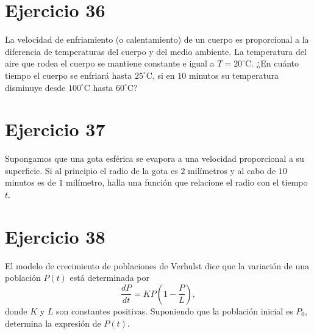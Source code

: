 \documentclass[12pt]{article}
\begin{document}
\section*{Ejercicio 36}
La velocidad de enfriamiento (o calentamiento) de un cuerpo es proporcional a la diferencia de temperaturas del cuerpo y del medio ambiente. La temperatura del aire que rodea el cuerpo se mantiene constante e igual a $T = 20^\circ\mathrm{C}$. ¿En cuánto tiempo el cuerpo se enfriará hasta $25^\circ\mathrm{C}$, si en $10$ minutos su temperatura disminuye desde $100^\circ\mathrm{C}$ hasta $60^\circ\mathrm{C}$?

\section*{Ejercicio 37}
Supongamos que una gota esférica se evapora a una velocidad proporcional a su superficie. Si al principio el radio de la gota es $2$ milímetros y al cabo de $10$ minutos es de $1$ milímetro, halla una función que relacione el radio con el tiempo $t$.

\section*{Ejercicio 38}
El modelo de crecimiento de poblaciones de Verhulst dice que la variación de una población $P(t)$ está determinada por
\[
\frac{dP}{dt} = KP\left(1 - \frac{P}{L}\right),
\]
donde $K$ y $L$ son constantes positivas. Suponiendo que la población inicial es $P_0$, determina la expresión de $P(t)$.
\end{document}
